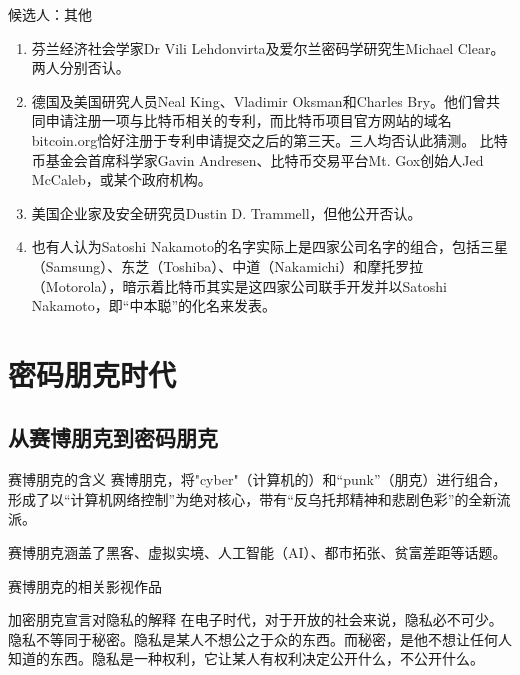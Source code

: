 \documentclass[11pt]{beamer}
\begin{document}
\begin{frame}{候选人：其他}
\begin{enumerate}
	\small
	\item 芬兰经济社会学家Dr Vili Lehdonvirta及爱尔兰密码学研究生Michael Clear。两人分别否认。
	\item 德国及美国研究人员Neal King、Vladimir Oksman和Charles Bry。他们曾共同申请注册一项与比特币相关的专利，而比特币项目官方网站的域名bitcoin.org恰好注册于专利申请提交之后的第三天。三人均否认此猜测。
	比特币基金会首席科学家Gavin Andresen、比特币交易平台Mt. Gox创始人Jed McCaleb，或某个政府机构。
	\item 美国企业家及安全研究员Dustin D. Trammell，但他公开否认。
	\item 也有人认为Satoshi Nakamoto的名字实际上是四家公司名字的组合，包括三星（Samsung）、东芝（Toshiba）、中道（Nakamichi）和摩托罗拉（Motorola），暗示着比特币其实是这四家公司联手开发并以Satoshi Nakamoto，即“中本聪”的化名来发表。
\end{enumerate}
\end{frame}

\section{密码朋克时代}
\subsection{从赛博朋克到密码朋克}
\begin{frame}{赛博朋克的含义}
	赛博朋克，将"cyber"（计算机的）和“punk”（朋克）进行组合，形成了以“计算机网络控制”为绝对核心，带有“反乌托邦精神和悲剧色彩”的全新流派。
	
	赛博朋克涵盖了黑客、虚拟实境、人工智能（AI）、都市拓张、贫富差距等话题。
\end{frame}

\begin{frame}{赛博朋克的相关影视作品}
	
\end{frame}

\begin{frame}{加密朋克宣言对隐私的解释}
	在电子时代，对于开放的社会来说，隐私必不可少。隐私不等同于秘密。隐私是某人不想公之于众的东西。而秘密，是他不想让任何人知道的东西。{\color{red}隐私是一种权利}，它让某人有权利决定公开什么，不公开什么。
	
	\hfill
	
\end{frame}
\end{document}
